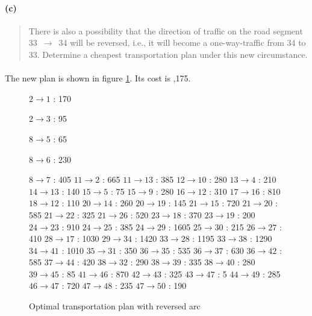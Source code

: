 \paragraph{(c)}
\begin{quote}
There is also a possibility that the direction of traffic on the road segment 33~$\rightarrow$~34 will be reversed, i.e., it will become a one-way-traffic from 34 to 33. Determine a cheapest transportation plan under this new circumstance.
\end{quote}

\paragraph{}
The new plan is shown in figure \ref{flow3-1c}. Its cost is ,175.

\begin{figure}[H]
\centering
\begin{multicols}{5}
$ 2 \rightarrow 1 $ : 170

$ 2 \rightarrow 3 $ : 95

$ 8 \rightarrow 5 $ : 65

$ 8 \rightarrow 6 $ : 230

$ 8 \rightarrow 7 $ : 405
$ 11 \rightarrow 2 $ : 665
$ 11 \rightarrow 13 $ : 385
$ 12 \rightarrow 10 $ : 280
$ 13 \rightarrow 4 $ : 210
$ 14 \rightarrow 13 $ : 140
$ 15 \rightarrow 5 $ : 75
$ 15 \rightarrow 9 $ : 280
$ 16 \rightarrow 12 $ : 310
$ 17 \rightarrow 16 $ : 810
$ 18 \rightarrow 12 $ : 110
$ 20 \rightarrow 14 $ : 260
$ 20 \rightarrow 19 $ : 145
$ 21 \rightarrow 15 $ : 720
$ 21 \rightarrow 20 $ : 585
$ 21 \rightarrow 22 $ : 325
$ 21 \rightarrow 26 $ : 520
$ 23 \rightarrow 18 $ : 370
$ 23 \rightarrow 19 $ : 200
$ 24 \rightarrow 23 $ : 910
$ 24 \rightarrow 25 $ : 385
$ 24 \rightarrow 29 $ : 1605
$ 25 \rightarrow 30 $ : 215
$ 26 \rightarrow 27 $ : 410
$ 28 \rightarrow 17 $ : 1030
$ 29 \rightarrow 34 $ : 1420
$ 33 \rightarrow 28 $ : 1195
$ 33 \rightarrow 38 $ : 1290
$ 34 \rightarrow 41 $ : 1010
$ 35 \rightarrow 31 $ : 350
$ 36 \rightarrow 35 $ : 535
$ 36 \rightarrow 37 $ : 630
$ 36 \rightarrow 42 $ : 585
$ 37 \rightarrow 44 $ : 420
$ 38 \rightarrow 32 $ : 290
$ 38 \rightarrow 39 $ : 335
$ 38 \rightarrow 40 $ : 280
$ 39 \rightarrow 45 $ : 85
$ 41 \rightarrow 46 $ : 870
$ 42 \rightarrow 43 $ : 325
$ 43 \rightarrow 47 $ : 5
$ 44 \rightarrow 49 $ : 285
$ 46 \rightarrow 47 $ : 720
$ 47 \rightarrow 48 $ : 235
$ 47 \rightarrow 50 $ : 190
\end{multicols}
\caption{Optimal transportation plan with reversed arc}
\label{flow3-1c}
\end{figure}
